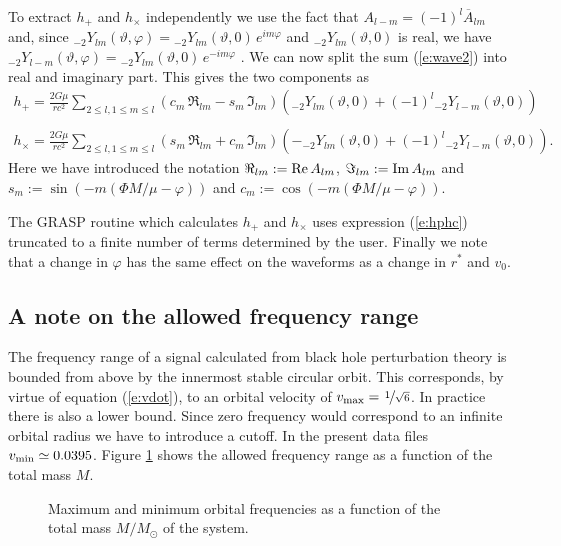 To extract $h_+$ and $h_\times$ independently  we use the fact that
$A_{l-m} = (-1)^l \overline{A}_{lm}$ and, since ${}_{-2}Y_{lm}(\vartheta, 
\varphi) = {}_{-2}Y_{lm}(\vartheta,0)\, e^{i m \varphi}$
and ${}_{-2}Y_{lm}(\vartheta,0)$ is real, we have
${}_{-2}Y_{l-m}(\vartheta, \varphi)= {}_{-2}Y_{lm}(\vartheta,0)\, 
e^{-i m \varphi}$ \cite{goldberg:1967}.
We can now split the sum (\ref{e:wave2}) into real and imaginary 
part. This gives the two components as
\begin{eqnarray}
  h_+ =  \frac{2 G \mu}{r c^2} \sum_{2 \leq l, 1 \leq m \leq l }
     \left(c_m \,  \Re_{lm} - s_m \,  \Im_{lm} \right) 
     \left({}_{-2}Y_{lm}(\vartheta,0) + (-1)^l 
     {}_{-2}Y_{l-m}(\vartheta,0)\right) \nonumber \\
     {} \label{e:hphc} \\
     h_{\times} =  \frac{2 G \mu}{r c^2} \sum_{2 \leq l, 1 \leq m \leq l}
     \left(s_m \, \Re_{lm} + c_m \,  \Im_{lm} \right) 
     \left(-{}_{-2}Y_{lm}(\vartheta,0) + (-1)^l 
     {}_{-2}Y_{l-m}(\vartheta,0)\right). \nonumber
\end{eqnarray}
Here we have introduced the notation $\Re_{lm} := {\rm Re}\, A_{lm}$, 
$\Im_{lm} := {\rm Im}\, A_{lm}$ and $s_m := \sin(-m (\Phi M/\mu  - \varphi))$ 
and $c_m := \cos(-m (\Phi M/\mu  - \varphi))$.


The GRASP routine which calculates $h_+$ and $h_\times$ uses 
expression (\ref{e:hphc}) truncated to a finite number of terms 
determined by the user.
Finally we note that a change in $\varphi$ has the same effect on the 
waveforms as a change in $r^*$ and $v_0$.

\subsection*{A note on the allowed frequency range}

The frequency range of a signal calculated from black hole 
perturbation theory is bounded from above by the  
innermost stable circular orbit. This corresponds, by virtue of 
equation (\ref{e:vdot}), to an orbital velocity of $v_{\rm max} = 
\nicefrac{1}{\sqrt{6}}$. In practice there is also a lower bound. Since 
zero frequency would correspond to an infinite orbital radius we have 
to introduce a cutoff. In the present data files $v_{\rm min} \simeq
 0.0395$. Figure \ref{f:frange} shows the allowed frequency range as 
 a function of the total mass $M$.
 

\begin{figure}[h]
\begin{center}
\caption{ \label{f:frange}
Maximum and minimum orbital frequencies as a function of the total mass
$M / M_\odot$ of the system.}
\end{center}
\end{figure}


